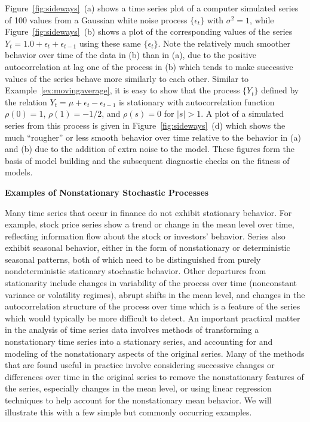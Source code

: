 \begin{ex}
Figure~\ref{fig:sideways}~(a) shows a time series plot of a computer simulated series of 100 values from a Gaussian white noise process $\{ \epsilon_t \}$ with $\sigma^2= 1$, while Figure~\ref{fig:sideways}~(b) shows a plot of the corresponding values of the series $Y_t = 1.0 + \epsilon_{t} + \epsilon_{t-1}$ using these same $\{\epsilon_t\}$.  Note the relatively much smoother behavior over time of the data in (b) than in (a), due to the positive autocorrelation at lag one of the process in (b) which tends to make successive values of the series behave more similarly to each other.  Similar to Example~\ref{ex:movingaverage}, it is easy to show that the process $\{Y_t\}$ defined by the relation $Y_t = \mu + \epsilon_{t} - \epsilon_{t-1}$ is stationary with autocorrelation function $\rho(0)= 1$, $\rho(1)= -1/2$, and $\rho(s)= 0$ for $\lvert s\rvert >1$. A plot of a simulated series from this process is given in Figure~\ref{fig:sideways}~(d) which shows the much ``rougher'' or less smooth behavior over time relative to the behavior  in (a) and (b) due to the addition of extra noise to the model. These figures form the basis of model building and the subsequent diagnostic checks on the fitness of models. \xqed
\end{ex} 


\noindent \textbf{Examples of Nonstationary Stochastic Processes} \twomedskip


Many time series that occur in finance do not exhibit stationary behavior.  For example, stock price series show a trend or change in the mean level over time, reflecting information flow about the stock or investors' behavior. Series also exhibit seasonal behavior, either in the form of nonstationary or deterministic seasonal patterns, both of which need to be distinguished from purely nondeterministic stationary stochastic behavior. Other departures from stationarity include changes in variability of the process over time (nonconstant variance or volatility regimes), abrupt shifts in the mean level, and changes in the autocorrelation structure of the process over time which is a feature of the series which would typically be more difficult to detect.  An important practical matter in the analysis of time series data involves methods of transforming a nonstationary time series into a stationary series, and accounting for and modeling of the nonstationary aspects of the original series. Many of the methods that are found useful in practice involve considering successive changes or differences over time in the original series to remove the nonstationary features of the series, especially changes in the mean level, or using linear regression techniques to help account for the nonstationary mean behavior.  We will illustrate this with a few simple but commonly occurring examples. 


